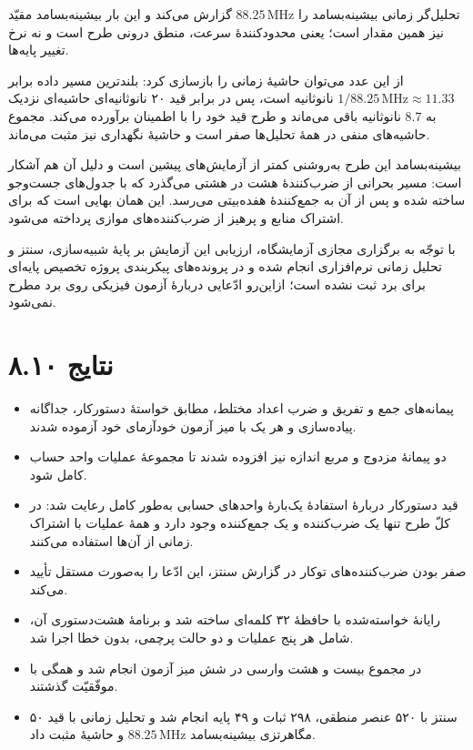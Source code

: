 \documentclass[12pt,a4paper]{article}
\begin{document}
	تحلیل‌گر زمانی بیشینه‌بسامد را \(88.25\,\mathrm{MHz}\) گزارش می‌کند و این بار بیشینه‌بسامد مقیّد نیز همین مقدار است؛ یعنی محدودکنندهٔ سرعت، منطق درونی طرح است و نه نرخ تغییر پایه‌ها.


	از این عدد می‌توان حاشیهٔ زمانی را بازسازی کرد: بلندترین مسیر داده برابر \(1/88.25\,\mathrm{MHz}\approx11.33\) نانوثانیه است، پس در برابر قید ۲۰ نانوثانیه‌ای حاشیه‌ای نزدیک به \(8.7\) نانوثانیه باقی می‌ماند و طرح قید خود را با اطمینان برآورده می‌کند. مجموع حاشیه‌های منفی در همهٔ تحلیل‌ها صفر است و حاشیهٔ نگهداری نیز مثبت می‌ماند.

	بیشینه‌بسامد این طرح به‌روشنی کمتر از آزمایش‌های پیشین است و دلیل آن هم آشکار است: مسیر بحرانی از ضرب‌کنندهٔ هشت در هشتی می‌گذرد که با جدول‌های جست‌وجو ساخته شده و پس از آن به جمع‌کنندهٔ هفده‌بیتی می‌رسد. این همان بهایی است که برای اشتراک منابع و پرهیز از ضرب‌کننده‌های موازی پرداخته می‌شود.

	با توجّه به برگزاری مجازی آزمایشگاه، ارزیابی این آزمایش بر پایهٔ شبیه‌سازی، سنتز و تحلیل زمانی نرم‌افزاری انجام شده و در پرونده‌های پیکربندی پروژه تخصیص پایه‌ای برای برد ثبت نشده است؛ ازاین‌رو ادّعایی دربارهٔ آزمون فیزیکی روی برد مطرح نمی‌شود.

	\section*{۸.۱۰ نتایج}
	\begin{itemize}
		\item پیمانه‌های جمع و تفریق و ضرب اعداد مختلط، مطابق خواستهٔ دستورکار، جداگانه پیاده‌سازی و هر یک با میز آزمون خودآزمای خود آزموده شدند.
		\item دو پیمانهٔ مزدوج و مربع اندازه نیز افزوده شدند تا مجموعهٔ عملیات واحد حساب کامل شود.
		\item قید دستورکار دربارهٔ استفادهٔ یک‌بارهٔ واحدهای حسابی به‌طور کامل رعایت شد: در کلّ طرح تنها یک ضرب‌کننده و یک جمع‌کننده وجود دارد و همهٔ عملیات با اشتراک زمانی از آن‌ها استفاده می‌کنند.
		\item صفر بودن ضرب‌کننده‌های توکار در گزارش سنتز، این ادّعا را به‌صورت مستقل تأیید می‌کند.
		\item رایانهٔ خواسته‌شده با حافظهٔ ۳۲ کلمه‌ای ساخته شد و برنامهٔ هشت‌دستوری آن، شامل هر پنج عملیات و دو حالت پرچمی، بدون خطا اجرا شد.
		\item در مجموع بیست و هشت وارسی در شش میز آزمون انجام شد و همگی با موفّقیّت گذشتند.
		\item سنتز با ۵۲۰ عنصر منطقی، ۲۹۸ ثبات و ۴۹ پایه انجام شد و تحلیل زمانی با قید ۵۰ مگاهرتزی بیشینه‌بسامد \(88.25\,\mathrm{MHz}\) و حاشیهٔ مثبت داد.
	\end{itemize}
\end{document}
